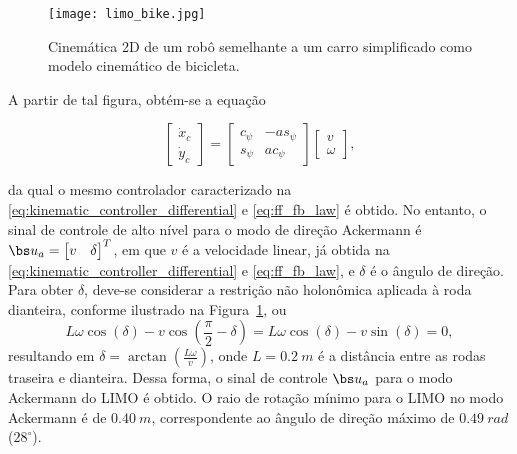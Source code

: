     \begin{figure}[htb]
        \centering
        \caption{Cinemática 2D de um robô semelhante a um carro simplificado como modelo cinemático de bicicleta.}
        \label{fig:ackermann_mode}
        \texttt{[image: limo\_bike.jpg]}
        \sourceParbox[0.8\linewidth]
    \end{figure}
    
    A partir de tal figura, obtém-se a equação
    
    \begin{equation}
        \begin{bmatrix} \dot{x}_c \\ \dot{y}_c \end{bmatrix}=\begin{bmatrix} c_\psi & -a s_\psi \\ s_\psi & a c_\psi \end{bmatrix}\begin{bmatrix} v \\ \omega \end{bmatrix},
    \end{equation}
    
    \noindent da qual o mesmo controlador caracterizado na \eqref{eq:kinematic_controller_differential} e \eqref{eq:ff_fb_law} é obtido. No entanto, o sinal de controle de alto nível para o modo de direção Ackermann é $\bs u_a = \begin{bmatrix}v & \delta\end{bmatrix}^T$, em que $v$ é a velocidade linear, já obtida na \eqref{eq:kinematic_controller_differential} e \eqref{eq:ff_fb_law}, e $\delta$ é o ângulo de direção. Para obter $\delta$, deve-se considerar a restrição não holonômica aplicada à roda dianteira, conforme ilustrado na Figura~\ref{fig:ackermann_mode}, ou
    \begin{equation}
        L\omega \cos(\delta) - v\cos\left(\frac{\pi}{2}-\delta\right) = L\omega \cos(\delta) -v\sin(\delta) = 0,
    \end{equation}
    \noindent resultando em $\delta=\arctan{\left(\frac{L\omega}{v}\right)}$, onde $L = 0.2~m$ é a distância entre as rodas traseira e dianteira. Dessa forma, o sinal de controle $\bs u_a$ para o modo Ackermann do LIMO é obtido. O raio de rotação mínimo para o LIMO no modo Ackermann é de $0.40~m$, correspondente ao ângulo de direção máximo de $0.49~ rad$ ($28^\circ$).
    
